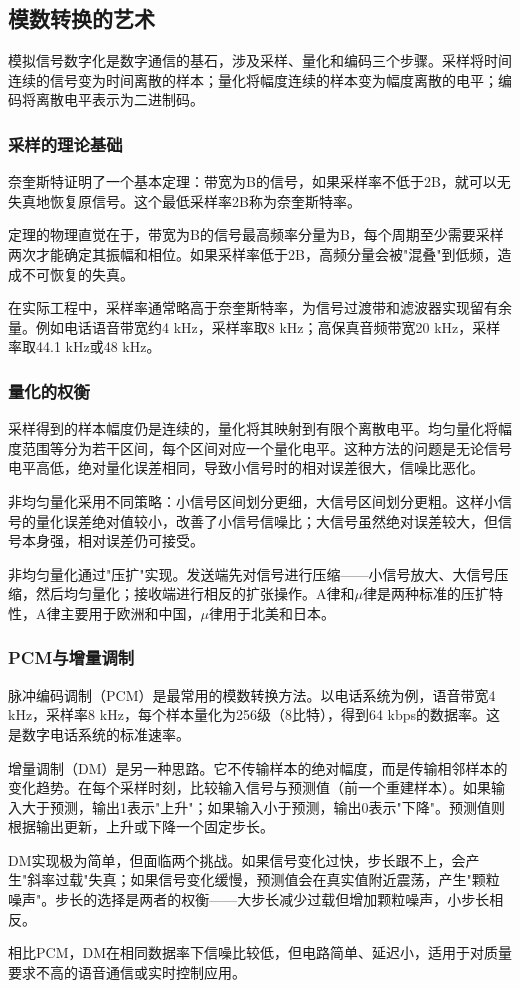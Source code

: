 \subsection{模数转换的艺术}

模拟信号数字化是数字通信的基石，涉及采样、量化和编码三个步骤。采样将时间连续的信号变为时间离散的样本；量化将幅度连续的样本变为幅度离散的电平；编码将离散电平表示为二进制码。

\subsubsection{采样的理论基础}

奈奎斯特证明了一个基本定理：带宽为B的信号，如果采样率不低于2B，就可以无失真地恢复原信号。这个最低采样率2B称为奈奎斯特率。

定理的物理直觉在于，带宽为B的信号最高频率分量为B，每个周期至少需要采样两次才能确定其振幅和相位。如果采样率低于2B，高频分量会被"混叠"到低频，造成不可恢复的失真。

在实际工程中，采样率通常略高于奈奎斯特率，为信号过渡带和滤波器实现留有余量。例如电话语音带宽约4 kHz，采样率取8 kHz；高保真音频带宽20 kHz，采样率取44.1 kHz或48 kHz。

\subsubsection{量化的权衡}

采样得到的样本幅度仍是连续的，量化将其映射到有限个离散电平。均匀量化将幅度范围等分为若干区间，每个区间对应一个量化电平。这种方法的问题是无论信号电平高低，绝对量化误差相同，导致小信号时的相对误差很大，信噪比恶化。

非均匀量化采用不同策略：小信号区间划分更细，大信号区间划分更粗。这样小信号的量化误差绝对值较小，改善了小信号信噪比；大信号虽然绝对误差较大，但信号本身强，相对误差仍可接受。

非均匀量化通过"压扩"实现。发送端先对信号进行压缩——小信号放大、大信号压缩，然后均匀量化；接收端进行相反的扩张操作。A律和$\mu$律是两种标准的压扩特性，A律主要用于欧洲和中国，$\mu$律用于北美和日本。

\subsubsection{PCM与增量调制}

脉冲编码调制（PCM）是最常用的模数转换方法。以电话系统为例，语音带宽4 kHz，采样率8 kHz，每个样本量化为256级（8比特），得到64 kbps的数据率。这是数字电话系统的标准速率。

增量调制（DM）是另一种思路。它不传输样本的绝对幅度，而是传输相邻样本的变化趋势。在每个采样时刻，比较输入信号与预测值（前一个重建样本）。如果输入大于预测，输出1表示"上升"；如果输入小于预测，输出0表示"下降"。预测值则根据输出更新，上升或下降一个固定步长。

DM实现极为简单，但面临两个挑战。如果信号变化过快，步长跟不上，会产生"斜率过载"失真；如果信号变化缓慢，预测值会在真实值附近震荡，产生"颗粒噪声"。步长的选择是两者的权衡——大步长减少过载但增加颗粒噪声，小步长相反。

相比PCM，DM在相同数据率下信噪比较低，但电路简单、延迟小，适用于对质量要求不高的语音通信或实时控制应用。
